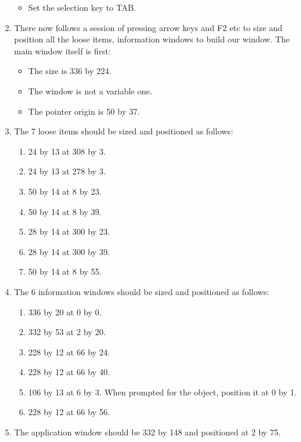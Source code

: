 \begin{enumerate}
{\begin{itemize}[itemsep=0pt]
\item{}Set the selection key to TAB.

\end{itemize}
}
\item{There now follows a session of pressing arrow keys and F2 etc to
        size and position all the loose items, information windows to build
        our window. The main window itself is first:
\begin{itemize}[itemsep=0pt]

\item{}The size is 336 by 224.


\item{}The window is not a variable one.


\item{}The pointer origin is 50 by 37.

\end{itemize}
}
\item{The 7 loose items should be sized and positioned as
        follows:
\begin{enumerate}[itemsep=0pt]

\item{}24 by 13 at 308 by 3.


\item{}24 by 13 at 278 by 3.


\item{}50 by 14 at 8 by 23.


\item{}50 by 14 at 8 by 39.


\item{}28 by 14 at 300 by 23.


\item{}28 by 14 at 300 by 39.


\item{}50 by 14 at 8 by 55.

\end{enumerate}
}
\item{The 6 information windows should be sized and positioned as
        follows:
\begin{enumerate}[itemsep=0pt]

\item{}336 by 20 at 0 by 0.


\item{}332 by 53 at 2 by 20.


\item{}228 by 12 at 66 by 24.


\item{}228 by 12 at 66 by 40.


\item{}106 by 13 at 6 by 3. When prompted for the object, position
            it at 0 by 1.


\item{}228 by 12 at 66 by 56.

\end{enumerate}
}
\item{The application window should be 332 by 148 and positioned at 2
        by 75.
}
\end{enumerate}

